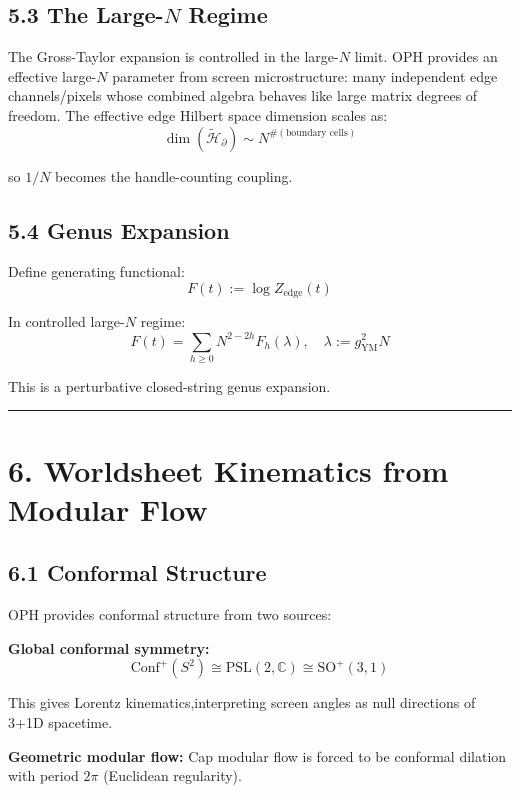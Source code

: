 \subsection{\texorpdfstring{5.3 The Large-\(N\) Regime}{5.3 The Large-N Regime}}\label{53-the-large-n-regime}

The Gross-Taylor expansion is controlled in the large-\(N\) limit. OPH provides an effective large-\(N\) parameter from screen microstructure: many independent edge channels/pixels whose combined algebra behaves like large matrix degrees of freedom. The effective edge Hilbert space dimension scales as: \[\dim(\tilde{\mathcal{H}}_\partial) \sim N^{\#(\text{boundary cells})}\]

so \(1/N\) becomes the handle-counting coupling.

\subsection{5.4 Genus Expansion}\label{54-genus-expansion}

Define generating functional: \[F(t) := \log Z_{\text{edge}}(t)\]

In controlled large-\(N\) regime: \[F(t) = \sum_{h \geq 0} N^{2-2h} F_h(\lambda), \quad \lambda := g_{\text{YM}}^2 N\]

This is a perturbative closed-string genus expansion.

\begin{center}\rule{0.5\linewidth}{0.5pt}\end{center}

\section{6. Worldsheet Kinematics from Modular Flow}\label{6-worldsheet-kinematics-from-modular-flow}

\subsection{6.1 Conformal Structure}\label{61-conformal-structure}

OPH provides conformal structure from two sources:

\textbf{Global conformal symmetry:} \[\text{Conf}^+(S^2) \cong \text{PSL}(2,\mathbb{C}) \cong \text{SO}^+(3,1)\]

This gives Lorentz kinematics,interpreting screen angles as null directions of 3+1D spacetime.

\textbf{Geometric modular flow:} Cap modular flow is forced to be conformal dilation with period \(2\pi\) (Euclidean regularity).

